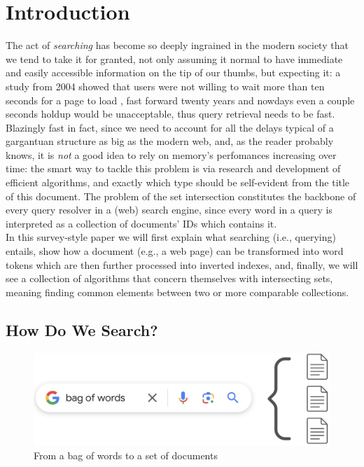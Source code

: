 \chapter{Introduction\label{intro}}

The act of \textit{searching} has become so deeply ingrained in the modern society that we tend to take it for granted, not only assuming it normal to have immediate and easily accessible information on the tip of our thumbs, but expecting it: a study from 2004 showed that users were not willing to wait more than ten seconds for a page to load \citep{waitTime}, fast forward twenty years and nowdays even a couple seconds holdup would be unacceptable, thus query retrieval needs to be fast. Blazingly fast in fact, since we need to account for all the delays typical of a gargantuan structure as big as the modern web, and, as the reader probably knows, it is \textit{not} a good idea to rely on memory's perfomances increasing over time: the smart way to tackle this problem is via research and development of efficient algorithms, and exactly which type should be self-evident from the title of this document. The problem of the set intersection constitutes the backbone of every query resolver in a (web) search engine, since every word in a query is interpreted as a collection of documents' IDs which contains it. \\
In this survey-style paper we will first explain what searching (i.e., querying) entails, show how a document (e.g., a web page) can be transformed into word tokens which are then further processed into inverted indexes, and, finally, we will see a collection of algorithms that concern themselves with intersecting sets, meaning finding common elements between two or more comparable collections. 

\section{How Do We Search?}

\begin{figure}[ht] 
\begin{center}
\includegraphics[width=.8\textwidth]{imgs/query_bagofwords.png}
\caption{From a bag of words to a set of documents\label{fig:bagtodocs}}
\end{center}
\end{figure}


